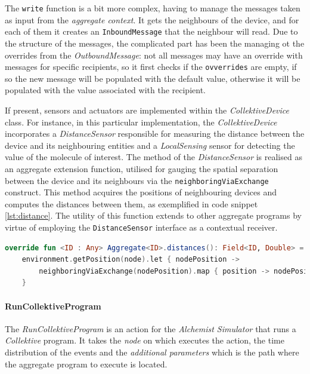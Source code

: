 The \texttt{write} function is a bit more complex, having to manage the messages taken as input from the \emph{aggregate context}.
It gets the neighbours of the device, and for each of them it creates an \texttt{InboundMessage} that the neighbour will read.
Due to the structure of the messages, the complicated part has been the managing ot the overrides from the \emph{OutboundMessage}:
not all messages may have an override with messages for specific recipients, so it first checks if the \texttt{ovverrides} are empty,
if so the new message will be populated with the default value, otherwise it will be populated with the value associated with the recipient.

If present, sensors and actuators are implemented within the \emph{CollektiveDevice} class.
For instance, in this particular implementation, the \emph{CollektiveDevice} incorporates a \emph{DistanceSensor} responsible for
measuring the distance between the device and its neighbouring entities and a \emph{LocalSensing} sensor for detecting the
value of the molecule of interest.
The method of the \emph{DistanceSensor} is realised as an aggregate extension function, utilised for gauging the spatial
separation between the device and its neighbours via the \texttt{neighboringViaExchange} construct.
This method acquires the positions of neighbouring devices and computes the distances between them, as exemplified in code snippet \ref{lst:distance}.
The utility of this function extends to other aggregate programs by virtue of employing the \texttt{DistanceSensor} interface as a contextual receiver.

\begin{lstlisting}[language=kt,label={lst:distance},caption={The implementation of the \texttt{distance} function.}]
override fun <ID : Any> Aggregate<ID>.distances(): Field<ID, Double> =
    environment.getPosition(node).let { nodePosition ->
        neighboringViaExchange(nodePosition).map { position -> nodePosition.distanceTo(position) }
    }
\end{lstlisting}

\paragraph{RunCollektiveProgram}
\label{par:run-collektive-program}
The \emph{RunCollektiveProgram} is an action for the \emph{Alchemist Simulator} that runs a \emph{Collektive} program.
It takes the \emph{node} on which executes the action, the time distribution of the events and the \emph{additional parameters}
which is the path where the aggregate program to execute is located.

